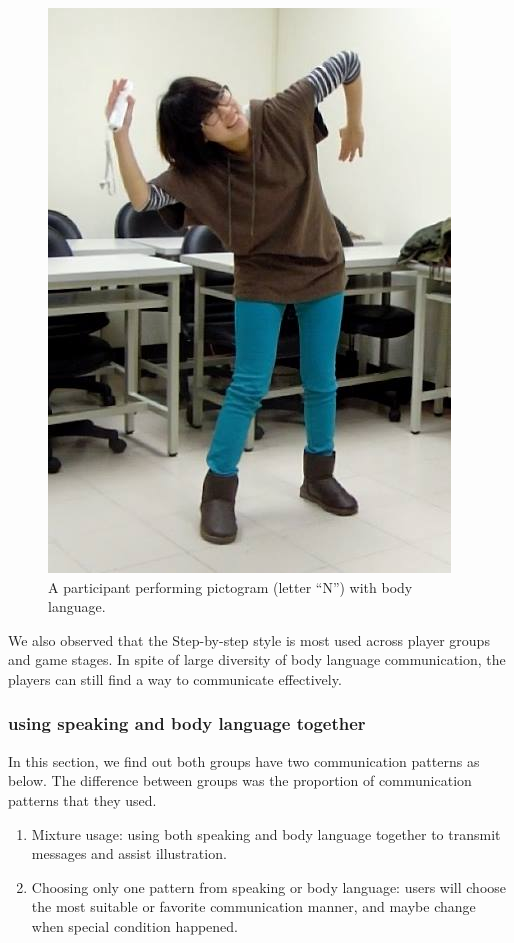 \begin{figure}[!h]
\centering
\includegraphics[width=0.4\columnwidth]{Figures/US_F3.jpg}
\caption{A participant performing pictogram (letter ``N'') with body language.}
\label{fig:US_F3}
\end{figure}

We also observed that the Step-by-step style is most used across player groups and game stages. In spite of large diversity of body language communication, the players can still find a way to communicate effectively.

\subsubsection{using speaking and body language together}
In this section, we find out both groups have two communication patterns as below. The difference between groups was the proportion of communication patterns that they used.

\begin{enumerate}
  \item Mixture usage: using both speaking and body language together to transmit messages and assist illustration.

  \item Choosing only one pattern from speaking or body language: users will choose the most suitable or favorite communication manner, and maybe change when special condition happened.
\end{enumerate}


